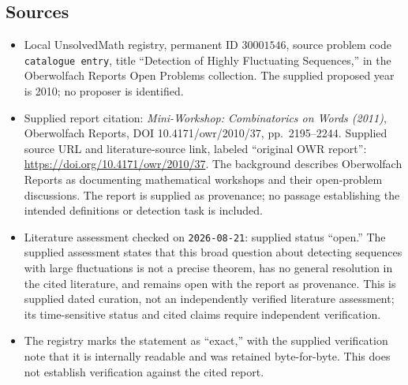 \documentclass[11pt]{article}
\begin{document}
\subsection{Sources}
\begin{itemize}
\item Local UnsolvedMath registry, permanent ID \(30001546\), source problem code \texttt{catalogue entry}, title ``Detection of Highly Fluctuating Sequences,'' in the Oberwolfach Reports Open Problems collection. The supplied proposed year is 2010; no proposer is identified.
\item Supplied report citation: \emph{Mini-Workshop: Combinatorics on Words (2011)}, Oberwolfach Reports, DOI 10.4171/owr/2010/37, pp.\ 2195--2244. Supplied source URL and literature-source link, labeled ``original OWR report'': \url{https://doi.org/10.4171/owr/2010/37}. The background describes Oberwolfach Reports as documenting mathematical workshops and their open-problem discussions. The report is supplied as provenance; no passage establishing the intended definitions or detection task is included.
\item Literature assessment checked on \texttt{2026-08-21}: supplied status ``open.'' The supplied assessment states that this broad question about detecting sequences with large fluctuations is not a precise theorem, has no general resolution in the cited literature, and remains open with the report as provenance. This is supplied dated curation, not an independently verified literature assessment; its time-sensitive status and cited claims require independent verification.
\item The registry marks the statement as ``exact,'' with the supplied verification note that it is internally readable and was retained byte-for-byte. This does not establish verification against the cited report.
\end{itemize}
\end{document}
